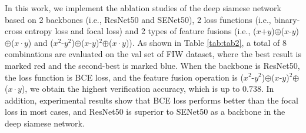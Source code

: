 \documentclass[a4paper, 10pt, conference]{ieeeconf}      %
\begin{document}
In this work, we implement the ablation studies of the deep siamese network based on 2 backbones (i.e., ResNet50 and SENet50), 2 loss functions (i.e., binary-cross entropy loss and focal loss) and 2 types of feature fusions (i.e., ($x$+$y$)$\oplus$($x$-$y$)$\oplus$($x\cdot y$) and ($x^2$-$y^2$)$\oplus$($x$-$y$)$^2$$\oplus$($x\cdot y$)). As shown in Table \ref{tab:tab2}, a total of 8 combinations are evaluated on the val set of FIW dataset, where the best result is marked red and the second-best is marked blue. When the backbone is ResNet50, the loss function is BCE loss, and the feature fusion operation is ($x^2$-$y^2$)$\oplus$($x$-$y$)$^2$$\oplus$($x\cdot y$), we obtain the highest verification accuracy, which is up to $0.738$. In addition, experimental results show that BCE loss performs better than the focal loss in most cases, and ResNet50 is superior to SENet50 as a backbone in the deep siamese network.
\end{document}
